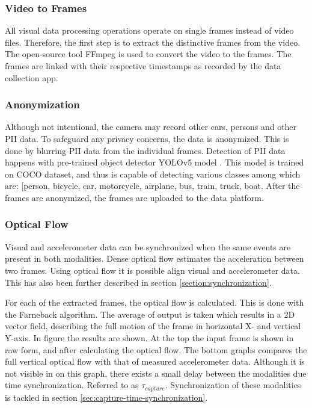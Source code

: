 \subsubsection{Video to Frames}
All visual data processing operations operate on single frames instead of video files. Therefore, the first step is to extract the distinctive frames from the video. The open-source tool FFmpeg \cite{ffmpeg} is used to convert the video to the frames. The frames are linked with their respective timestamps as recorded by the data collection app.


\subsubsection{Anonymization}
Although not intentional, the camera may record other cars, persons and other PII data. To safeguard any privacy concerns, the data is anonymized. This is done by blurring PII data from the individual frames. Detection of PII data happens with pre-trained object detector YOLOv5 model \cite{Jocher2021}. This model is trained on COCO dataset, and thus is capable of detecting various classes among which are: [person, bicycle, car, motorcycle, airplane, bus, train, truck, boat. After the frames are anonymized, the frames are uploaded to the data platform. 


\subsubsection{Optical Flow}
Visual and accelerometer data can be synchronized when the same events are present in both modalities. Dense optical flow estimates the acceleration between two frames. Using optical flow it is possible align visual and accelerometer data. This has also been further described in section \ref{section:synchronization}. 

For each of the extracted frames, the optical flow is calculated. This is done with the Farneback algorithm\cite{Farnebäck2003}. The average of output is taken which results in a 2D vector field, describing the full motion of the frame in horizontal X- and vertical Y-axis. In figure \label{fig:optical-flow} the results are shown. At the top the input frame is shown in raw form, and after calculating the optical flow. The bottom graphs compares the full vertical optical flow with that of measured accelerometer data. Although it is not visible in on this graph, there exists a small delay between the modalities due time synchronization. Referred to as $\tau_{capture}$. Synchronization of these modalities is tackled in section \ref{sec:capture-time-synchronization}.

